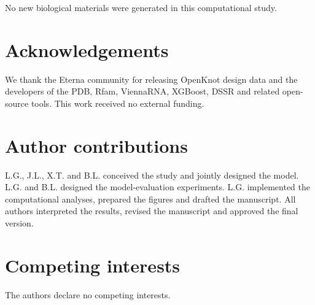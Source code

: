 No new biological materials were generated in this computational study.

\section*{Acknowledgements}

We thank the Eterna community for releasing OpenKnot design data and the
developers of the PDB, Rfam, ViennaRNA, XGBoost, DSSR and related open-source
tools. This work received no external funding.

\section*{Author contributions}

L.G., J.L., X.T. and B.L. conceived the study and jointly designed the model.
L.G. and B.L. designed the model-evaluation experiments. L.G. implemented the
computational analyses, prepared the figures and drafted the manuscript. All
authors interpreted the results, revised the manuscript and approved the final
version.

\section*{Competing interests}

The authors declare no competing interests.
